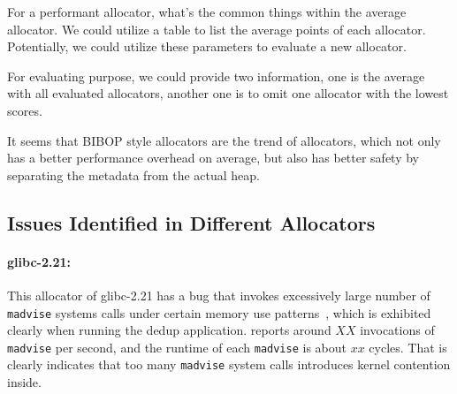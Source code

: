 


For a performant allocator, what's the common things within the average allocator. We could utilize a table to list the average points of each allocator. Potentially, we could utilize these parameters to evaluate a new allocator. 

For evaluating purpose, we could provide two information, one is the average with all evaluated allocators, another one is to omit one allocator with the lowest scores. 


It seems that BIBOP style allocators are the trend of allocators, which not only has a better performance overhead on average, but also has better safety by separating the metadata from the actual heap. 

\subsection{Issues Identified in Different Allocators}

\paragraph{glibc-2.21:}
This allocator of glibc-2.21 has a bug that invokes excessively large number of \texttt{madvise} systems calls under certain memory use patterns~\cite{madvise}, which is exhibited clearly when running the dedup application. \MP{} reports around $XX$ invocations of \texttt{madvise} per second, and the runtime of each \texttt{madvise} is about $xx$ cycles. That is clearly indicates that too many \texttt{madvise} system calls introduces kernel contention inside. 

